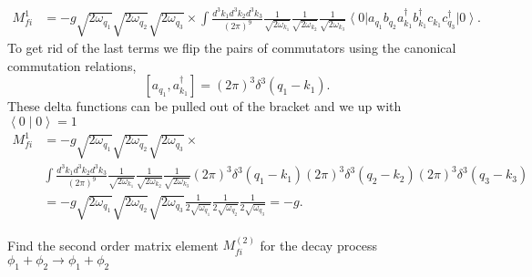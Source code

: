 \documentclass[working, oneside]{../../Preambles/tuftebook}
\begin{document}
\begin{align*}
    M^{1}_{fi} &=-g \sqrt{2\omega_{q_1}} \sqrt{2\omega_{q_2}}\sqrt{2\omega_{q_3}} \times\int \frac{d^3k_1d^3k_2d^3k_3}{\left( 2\pi \right) ^9}\frac{1}{\sqrt{2\omega_{k_1}} }\frac{1}{\sqrt{2\omega_{k_2}} }\frac{1}{\sqrt{2\omega_{k_3}} }\left<0 \right|a_{q_1}b_{q_2} a_{k_1}^\dagger b_{k_1}^\dagger c_{k_1}c_{q_3}^\dagger \left|0 \right> 
.\end{align*}
To get rid of the last terms we flip the pairs of commutators using the canonical commutation relations,
\[
\left[ a_{q_1}, a_{k_1}^\dagger \right] = \left( 2\pi \right) ^3\delta^3\left( q_1 - k_1 \right) 
.\] 
These delta functions can be pulled out of the bracket and we up with $\left<0 \mid  0 \right> =1$ 
\begin{align*}
    M^{1}_{fi} &= -g\sqrt{2\omega_{q_1}} \sqrt{2\omega_{q_2}}\sqrt{2\omega_{q_3}} \times\\
               &\int \frac{d^3k_1d^3k_2d^3k_3}{\left( 2\pi \right) ^9}\frac{1}{\sqrt{2\omega_{k_1}} }\frac{1}{\sqrt{2\omega_{k_2}} }\frac{1}{\sqrt{2\omega_{k_3}} }  \left( 2\pi \right) ^3\delta^3\left( q_1 - k_1 \right)  \left( 2\pi \right) ^3\delta^3\left( q_2 - k_2 \right)  \left( 2\pi \right) ^3\delta^3\left( q_3 - k_3 \right) \\
     &= -g\sqrt{2\omega_{q_1}} \sqrt{2\omega_{q_2}}\sqrt{2\omega_{q_3}} \frac{1}{2\sqrt{\omega_{q_1}} }\frac{1}{2\sqrt{\omega_{q_2}} }\frac{1}{2\sqrt{\omega_{q_3}} } = -g
.\end{align*}
\begin{exercise}[3]
Find the second order matrix element $M_{fi}^{\left( 2 \right) }$ for the decay process $\phi_1 + \phi_2 \to  \phi_1 + \phi_2$
\end{exercise}
\end{document}
